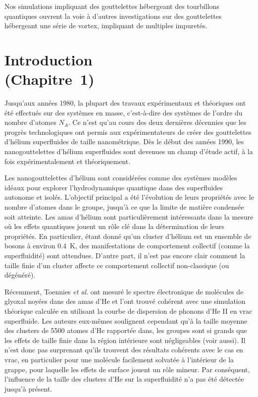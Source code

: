 	Nos simulations impliquant des gouttelettes hébergeant des tourbillons quantiques ouvrent la voie à d'autres investigations sur des gouttelettes hébergeant une série de vortex, impliquant de multiples impuretés.
		
	\section*{Introduction\\\small(Chapitre~1)}
		Jusqu'aux années 1980, la plupart des travaux expérimentaux et théoriques ont été effectués sur des systèmes en masse, c'est-à-dire des systèmes de l'ordre du nombre d'atomes $N_A$. Ce n'est qu'au cours des deux dernières décennies que les progrès technologiques ont permis aux expérimentateurs de créer des gouttelettes d'hélium superfluides de taille nanométrique. Dès le début des années 1990, les nanogouttelettes d'hélium superfluides sont devenues un champ d'étude actif, à la fois expérimentalement et théoriquement. 
		
		Les nanogouttelettes d'hélium sont considérées comme des systèmes modèles idéaux pour explorer l'hydrodynamique quantique dans des superfluides autonome et isolés. L'objectif principal a été l'évolution de leurs propriétés avec le nombre d'atomes dans le groupe, jusqu'à ce que la limite de matière condensée soit atteinte. Les amas d'hélium sont particulièrement intéressants dans la mesure où les effets quantiques jouent un rôle clé dans la détermination de leurs propriétés. En particulier, étant donné qu'un cluster d'hélium est un ensemble de bosons à environ 0.4~K\citep{Brink1990, Hartmann1995}, des manifestations de comportement collectif (comme la superfluidité) sont attendues. D'autre part, il n'est pas encore clair comment la taille finie d'un cluster affecte ce comportement collectif non-classique (ou dégénéré).

		Récemment, Toennies \emph{et al}. ont mesuré le spectre électronique de molécules de glyoxal noyées dans des amas d'He\citep{Hartmann1996} et l'ont trouvé cohérent avec une simulation théorique calculée en utilisant la courbe de dispersion de phonons d'He II en vrac superfluide. Les auteurs eux-mêmes soulignent cependant qu'à la taille moyenne des clusters de 5500 atomes d'He rapportée dans, les groupes sont si grands que les effets de taille finie dans la région intérieure sont négligeables (voir aussi). Il n'est donc pas surprenant qu'ils trouvent des résultats cohérents avec le cas en vrac, en particulier pour une molécule facilement solvatée à l'intérieur de la grappe, pour laquelle les effets de surface jouent un rôle mineur. Par conséquent, l'influence de la taille des clusters d'He sur la superfluidité n'a pas été détectée jusqu'à présent.


